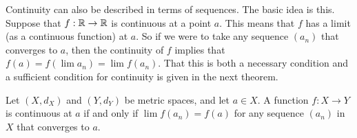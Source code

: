 \begin{comment}

\ActivitySolution
	\ba
	\item Since $a$ is a limit of $(a_n)$, the definition of a limit of a sequence states that, given $\frac{\epsilon}{2}$ (using $\frac{\epsilon}{2}$ in place of $\epsilon$), there exists a positive integer $N$ so that $d(a_n, a) < \frac{\epsilon}{2}$ for all $n \geq N$.

	\item Since $a'$ is a limit of $(a_n)$, the definition of a limit of a sequence states that, given $\frac{\epsilon}{2}$ (using $\frac{\epsilon}{2}$ in place of $\epsilon$), there exists a positive integer $N'$ so that $d(a_n, a') < \frac{\epsilon}{2}$ for all $n \geq N'$.

	\item Since $m$ is larger than $N$ we know that $d(a_m,a) < \frac{\epsilon}{2}$. Since $m$ is larger than $N'$ we know that $d(a_m,a') < \frac{\epsilon}{2}$. 
		
	\item We now have that
	\[d(a,a') \leq d(a,a_m) + d(a_m,a') < \frac{\epsilon}{2} + \frac{\epsilon}{2} = \epsilon.\]
	From this we can conclude that $a = a'$. 
	
	\ea

\end{comment}

Continuity can also be described in terms of sequences. The basic idea is this. Suppose that $f : \mathbb{R} \to \mathbb{R}$ is continuous at a point $a$. This means that $f$ has a limit (as a continuous function) at $a$. So if we were to take any sequence $(a_n)$ that converges to $a$, then the continuity of $f$ implies that $f(a) = f(\lim a_n) = \lim f(a_n)$. That this is both a necessary condition and a sufficient condition for continuity is given in the next theorem.

\begin{theorem} \label{thm:seq_continuity}  Let $(X,d_X)$ and $(Y,d_Y)$ be metric spaces, and let $a \in X$. A function $f:X \to Y$ is continuous at $a$ if and only if $\lim f(a_n) = f(a)$ for any sequence $(a_n)$ in $X$ that converges to $a$. 
\end{theorem}

